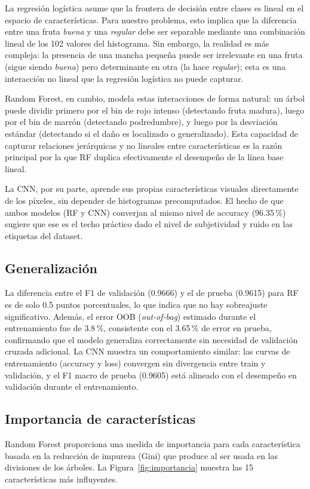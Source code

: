 \documentclass[conference]{IEEEtran}
\begin{document}
La regresión logística asume que la frontera de decisión entre clases es lineal en el espacio de características. Para nuestro problema, esto implica que la diferencia entre una fruta \emph{buena} y una \emph{regular} debe ser separable mediante una combinación lineal de los 102 valores del histograma. Sin embargo, la realidad es más compleja: la presencia de una mancha pequeña puede ser irrelevante en una fruta (sigue siendo \emph{buena}) pero determinante en otra (la hace \emph{regular}); esta es una interacción no lineal que la regresión logística no puede capturar.

Random Forest, en cambio, modela estas interacciones de forma natural: un árbol puede dividir primero por el bin de rojo intenso (detectando fruta madura), luego por el bin de marrón (detectando podredumbre), y luego por la desviación estándar (detectando si el daño es localizado o generalizado). Esta capacidad de capturar relaciones jerárquicas y no lineales entre características es la razón principal por la que RF duplica efectivamente el desempeño de la línea base lineal.

La CNN, por su parte, aprende sus propias características visuales directamente de los píxeles, sin depender de histogramas precomputados. El hecho de que ambos modelos (RF y CNN) converjan al mismo nivel de accuracy (96.35\,\%) sugiere que ese es el techo práctico dado el nivel de subjetividad y ruido en las etiquetas del dataset.

\subsection{Generalización}
La diferencia entre el F1 de validación (0.9666) y el de prueba (0.9615) para RF es de solo 0.5 puntos porcentuales, lo que indica que no hay sobreajuste significativo. Además, el error OOB (\emph{out-of-bag}) estimado durante el entrenamiento fue de 3.8\,\%, consistente con el 3.65\,\% de error en prueba, confirmando que el modelo generaliza correctamente sin necesidad de validación cruzada adicional. La CNN muestra un comportamiento similar: las curvas de entrenamiento (accuracy y loss) convergen sin divergencia entre train y validación, y el F1 macro de prueba (0.9605) está alineado con el desempeño en validación durante el entrenamiento.

\subsection{Importancia de características}
Random Forest proporciona una medida de importancia para cada característica basada en la reducción de impureza (Gini) que produce al ser usada en las divisiones de los árboles. La Figura~\ref{fig:importancia} muestra las 15 características más influyentes.
\end{document}
